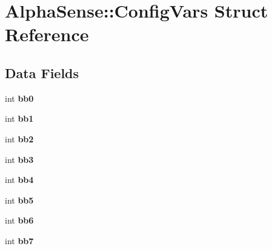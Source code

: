 \hypertarget{structAlphaSense_1_1ConfigVars}{}\section{Alpha\+Sense\+:\+:Config\+Vars Struct Reference}
\label{structAlphaSense_1_1ConfigVars}
\subsection*{Data Fields}
\begin{DoxyCompactItemize}
\item 
\mbox{\label{structAlphaSense_1_1ConfigVars_ae7f7401c3ac002939b51cc96ce9f553b}} 
int {\bfseries bb0}
\item 
\mbox{\label{structAlphaSense_1_1ConfigVars_adcc62c84f6184d10b849d2bff9b2397e}} 
int {\bfseries bb1}
\item 
\mbox{\label{structAlphaSense_1_1ConfigVars_aaf973f9bc40f32c27941bbf0f6ab9c53}} 
int {\bfseries bb2}
\item 
\mbox{\label{structAlphaSense_1_1ConfigVars_a35f9ac1c9bd24dfde7bb9c2a2ead9b84}} 
int {\bfseries bb3}
\item 
\mbox{\label{structAlphaSense_1_1ConfigVars_a886e15d248e47c1965cf9b054dd2a7f9}} 
int {\bfseries bb4}
\item 
\mbox{\label{structAlphaSense_1_1ConfigVars_a2dfc30f9686d91664e834c0c5f706ee5}} 
int {\bfseries bb5}
\item 
\mbox{\label{structAlphaSense_1_1ConfigVars_a67a5892ad126d82709c9ddc58927ee61}} 
int {\bfseries bb6}
\item 
\mbox{\label{structAlphaSense_1_1ConfigVars_a18bce779b2f6032abb0b4bb5798df538}} 
int {\bfseries bb7}
\item 
\mbox{\label{structAlphaSense_1_1ConfigVars_a86593ad5dbb84949bf3555f34cd99b5c}} 

\end{DoxyCompactItemize}
